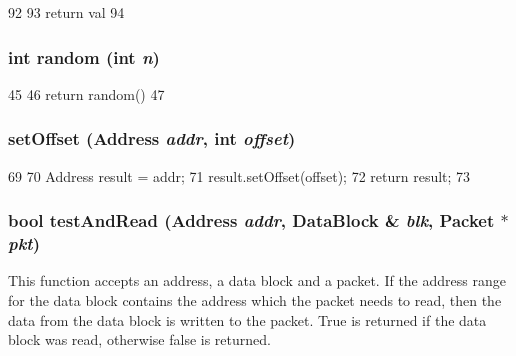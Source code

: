 \begin{DoxyCode}
92 {
93     return val %
94 }
\end{DoxyCode}
\hypertarget{RubySlicc__Util_8hh_a054fe6e7aa3343d6fee7974f712d356f}{
\subsubsection[{random}]{\setlength{\rightskip}{0pt plus 5cm}int random (int {\em n})}}
\label{RubySlicc__Util_8hh_a054fe6e7aa3343d6fee7974f712d356f}



\begin{DoxyCode}
45 {
46   return random() %
47 }
\end{DoxyCode}
\hypertarget{RubySlicc__Util_8hh_aefc491106ae51d13fd4de1da69584186}{
\subsubsection[{setOffset}]{ setOffset ({\bf Address} {\em addr}, \/  int {\em offset})}}
\label{RubySlicc__Util_8hh_aefc491106ae51d13fd4de1da69584186}



\begin{DoxyCode}
69 {
70     Address result = addr;
71     result.setOffset(offset);
72     return result;
73 }
\end{DoxyCode}
\hypertarget{RubySlicc__Util_8hh_a2d64f5e793ff434a195baa19092fdc7c}{
\subsubsection[{testAndRead}]{\setlength{\rightskip}{0pt plus 5cm}bool testAndRead ({\bf Address} {\em addr}, \/  {\bf DataBlock} \& {\em blk}, \/  {\bf Packet} $\ast$ {\em pkt})}}
\label{RubySlicc__Util_8hh_a2d64f5e793ff434a195baa19092fdc7c}
This function accepts an address, a data block and a packet. If the address range for the data block contains the address which the packet needs to read, then the data from the data block is written to the packet. True is returned if the data block was read, otherwise false is returned. 


